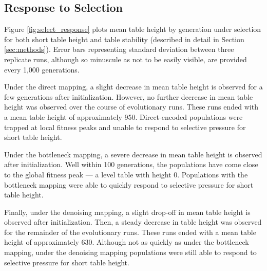 \subsection{Response to Selection}



Figure \ref{fig:select_response} plots mean table height by generation under selection for both short table height and table stability (described in detail in Section \ref{sec:methods}).
Error bars representing standard deviation between three replicate runs, although so minuscule as not to be easily visible, are provided every 1,000 generations.

Under the direct mapping, a slight decrease in mean table height is observed for a few generations after initialization.
However, no further decrease in mean table height was observed over the course of evolutionary runs.
These runs ended with a mean table height of approximately 950.
Direct-encoded populations were trapped at local fitness peaks and unable to respond to selective pressure for short table height.

Under the bottleneck mapping, a severe decrease in mean table height is observed after initialization.
Well within 100 generations, the populations have come close to the global fitness peak --- a level table with height 0.
Populations with the bottleneck mapping were able to quickly respond to selective pressure for short table height.

Finally, under the denoising mapping, a slight drop-off in mean table height is observed after initialization.
Then, a steady decrease in table height was observed for the remainder of the evolutionary runs.
These runs ended with a mean table height of approximately 630.
Although not as quickly as under the bottleneck mapping, under the denoising mapping populations were still able to respond to selective pressure for short table height.
